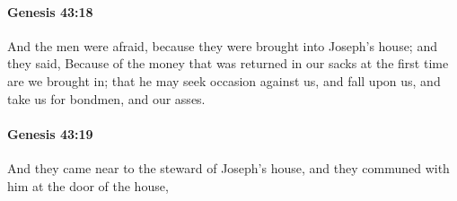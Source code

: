 		\paragraph{Genesis 43:18} %
			\label{GENESIS-43-18}

			And the men were afraid, because they were brought into Joseph's house; and they said, Because of the money that was returned in our sacks at the first time are we brought in; that he may seek occasion against us, and fall upon us, and take us for bondmen, and our asses.


		\paragraph{Genesis 43:19} %
			\label{GENESIS-43-19}

			And they came near to the steward of Joseph's house, and they communed with him at the door of the house,


